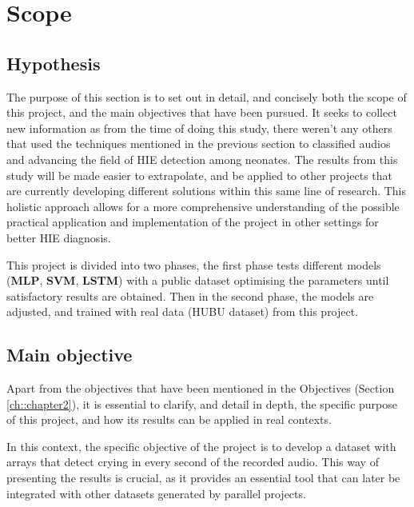 %
\chapter{Scope}
\label{ch::chapter4}

\section{Hypothesis}

The purpose of this section is to set out in detail, and concisely both the scope of this project, and the main objectives that have been pursued. It seeks to collect new information as from the time of doing this study, there weren’t any others that used the techniques mentioned in the previous section to classified audios and advancing the field of HIE detection among neonates. The results from this study will be made easier to extrapolate, and be applied to other projects that are currently developing different solutions within this same line of research. This holistic approach allows for a more comprehensive understanding of the possible practical application and implementation of the project in other settings for better HIE diagnosis. 


\begin{tcolorbox}
This project is divided into two phases, the first phase tests different models (\textbf{MLP}, \textbf{SVM}, \textbf{LSTM}) with a public dataset optimising the parameters until satisfactory results are obtained. Then in the second phase, the models are adjusted, and trained with real data (HUBU dataset) from this project.
\end{tcolorbox}

\section{Main objective}
Apart from the objectives that have been mentioned in the Objectives (Section \ref{ch::chapter2}), it is essential to clarify, and detail in depth, the specific purpose of this project, and how its results can be applied in real contexts. 


\begin{tcolorbox}
In this context, the specific objective of the project is to develop a dataset with arrays that detect crying in every second of the recorded audio. This way of presenting the results is crucial, as it provides an essential tool that can later be integrated with other datasets generated by parallel projects. 
\end{tcolorbox}

